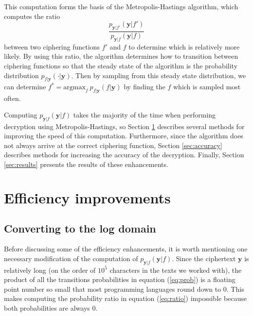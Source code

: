 \documentclass{article}
\begin{document}
This computation forms the basis of the Metropolis-Hastings algorithm, which computes the ratio
\begin{equation}\label{eq:ratio}
    \frac{p_{\mathbf{y}|f'}(\mathbf{y}|f')}{p_{\mathbf{y}|f}(\mathbf{y}|f)}
\end{equation}
between two ciphering functions $f'$ and $f$ to determine which is relatively more likely. By using this ratio, the algorithm determines how to transition between ciphering functions so that the steady state of the algorithm is the probability distribution $p_{f|\mathbf{y}}(\cdot|\mathbf{y})$. Then by sampling from this steady state distribution, we can determine $f^* = \textrm{argmax}_f\ p_{f|\mathbf{y}}(f|\mathbf{y})$ by finding the $f$ which is sampled most often.

Computing $p_{\mathbf{y}|f}(\mathbf{y}|f)$ takes the majority of the time when performing decryption using Metropolis-Hastings, so Section \ref{sec:efficiency} describes several methods for improving the speed of this computation. Furthermore, since the algorithm does not always arrive at the correct ciphering function, Section \ref{sec:accuracy} describes methods for increasing the accuracy of the decryption. Finally, Section \ref{sec:results} presents the results of these enhancements.

\section{Efficiency improvements}\label{sec:efficiency}

\subsection{Converting to the log domain}\label{subsec:log_domain}

Before discussing some of the efficiency enhancements, it is worth mentioning one necessary modification of the computation of $p_{\mathbf{y}|f}(\mathbf{y}|f)$. Since the ciphertext $\mathbf{y}$ is relatively long (on the order of $10^5$ characters in the texts we worked with), the product of all the transitions probabilities in equation (\ref{eq:prob}) is a floating point number so small that most programming languages round down to 0. This makes computing the probability ratio in equation (\ref{eq:ratio}) impossible because both probabilities are always 0.
\end{document}
